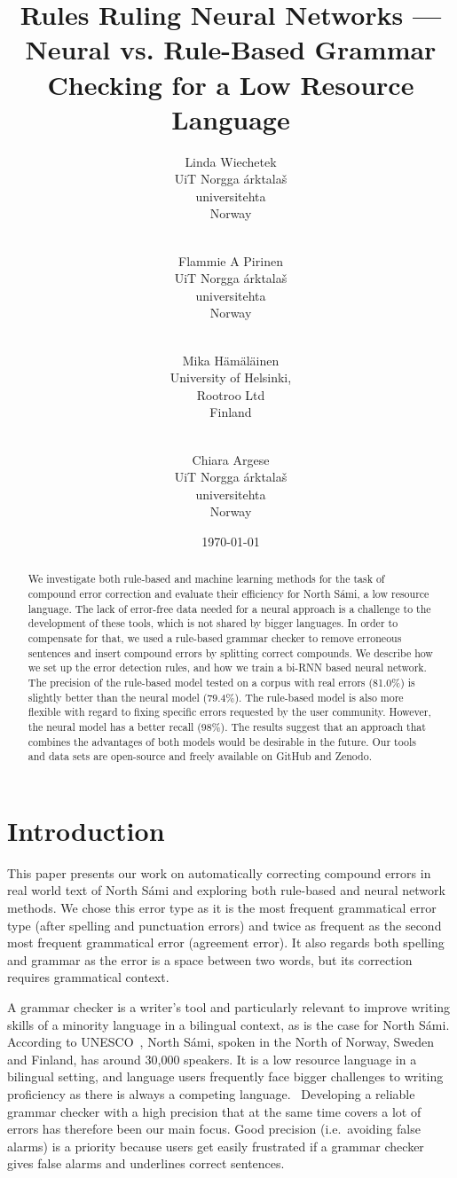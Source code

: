 \documentclass[postprint]{flammie}
\title{Rules Ruling Neural Networks --- \\
Neural vs. Rule-Based Grammar Checking for a Low Resource
Language\footnotepubrights{find original in ACL anthology}}
\author{Linda Wiechetek\\
UiT Norgga árktalaš\\
universitehta \\
Norway \\
  \\\and{}
  Flammie A Pirinen \\ %
UiT Norgga árktalaš\\
universitehta \\  %
Norway \\
  \\\and{}
  Mika Hämäläinen \\ %
University of Helsinki, \\
   Rootroo Ltd \\
  Finland\\
  \\\and{}
  Chiara Argese\\ %
UiT Norgga árktalaš\\
universitehta \\
Norway \\
}
\date{\today}
\begin{document}
\maketitle
\begin{abstract}

We investigate both rule-based and machine learning methods for the task of
compound error correction and evaluate their efficiency for North Sámi, a
low resource language.  The lack of error-free data needed for a neural
approach is a challenge to the development of these tools, which is not
shared by bigger languages. In order to compensate for that, we used a
rule-based grammar checker to remove erroneous sentences and insert compound
errors by splitting correct compounds.  We describe how we set up the error
detection rules, and how we train a bi-RNN based neural network.  The
precision of the rule-based model tested on a corpus with real errors
(81.0\%) is slightly better than the neural model (79.4\%). The rule-based
model is also more flexible with regard to fixing specific errors requested
by the user community. However, the neural model has a better recall (98\%).
The results suggest that an approach that combines the advantages of both
models would be desirable in the future. Our tools and data sets are
open-source and freely available on GitHub and Zenodo.
\end{abstract}

\section{Introduction}


This paper presents our work on automatically correcting compound errors in real
world text of North Sámi and exploring both rule-based and neural network
methods.  We chose this error type as it is the most frequent grammatical error
type (after spelling and punctuation errors) and twice as frequent as the second
most frequent grammatical error (agreement error). It also regards both spelling
and grammar as the error is a space between two words, but its correction
requires grammatical context.

A grammar checker is a writer's tool and particularly relevant to improve
writing skills of a minority language in a bilingual context, as is the case for
North Sámi.  According to UNESCO~\cite{moseley2010atlas}, North Sámi, spoken in
the North of Norway, Sweden and Finland, has around 30,000 speakers. It is a low
resource language in a bilingual setting, and language users frequently face
bigger challenges to writing proficiency as there is always a competing
language.~\cite{outakoski2015davvisamegielat} Developing a reliable grammar
checker with a high precision that at the same time covers a lot of errors has
therefore been our main focus.  Good precision (i.e.\ avoiding false alarms) is
a priority because users get easily frustrated if a grammar checker gives false
alarms and underlines correct sentences.
\end{document}
